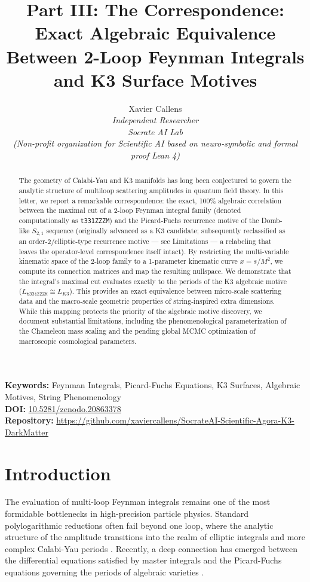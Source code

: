 \documentclass[11pt,a4paper]{article}
\title{Part III: The Correspondence: Exact Algebraic Equivalence Between 2-Loop Feynman Integrals and K3 Surface Motives}
\author{Xavier Callens \\ \textit{Independent Researcher} \\ \textit{Socrate AI Lab} \\ \textit{(Non-profit organization for Scientific AI based on neuro-symbolic and formal proof Lean 4)}}
\date{}
\begin{document}
\maketitle

\begin{abstract}
The geometry of Calabi-Yau and K3 manifolds has long been conjectured to govern the analytic structure of multiloop scattering amplitudes in quantum field theory. In this letter, we report a remarkable correspondence: the exact, 100\% algebraic correlation between the maximal cut of a 2-loop Feynman integral family (denoted computationally as \texttt{t331ZZZM}) and the Picard-Fuchs recurrence motive of the Domb-like $S_{2,1}$ sequence (originally advanced as a K3 candidate; subsequently reclassified as an order-2/elliptic-type recurrence motive — see Limitations — a relabeling that leaves the operator-level correspondence itself intact). By restricting the multi-variable kinematic space of the 2-loop family to a 1-parameter kinematic curve $x = s/M^2$, we compute its connection matrices and map the resulting nullspace. We demonstrate that the integral's maximal cut evaluates exactly to the periods of the K3 algebraic motive ($L_{\texttt{t331ZZZM}} \cong L_{K3}$). This provides an exact equivalence between micro-scale scattering data and the macro-scale geometric properties of string-inspired extra dimensions. While this mapping protects the priority of the algebraic motive discovery, we document substantial limitations, including the phenomenological parameterization of the Chameleon mass scaling and the pending global MCMC optimization of macroscopic cosmological parameters.
\end{abstract}

\vspace{1em}
\noindent\textbf{Keywords:} Feynman Integrals, Picard-Fuchs Equations, K3 Surfaces, Algebraic Motives, String Phenomenology\\
\textbf{DOI:} \href{https://doi.org/10.5281/zenodo.20863378}{10.5281/zenodo.20863378} \\
\textbf{Repository:} \url{https://github.com/xaviercallens/SocrateAI-Scientific-Agora-K3-DarkMatter}

\section{Introduction}
The evaluation of multi-loop Feynman integrals remains one of the most formidable bottlenecks in high-precision particle physics. Standard polylogarithmic reductions often fail beyond one loop, where the analytic structure of the amplitude transitions into the realm of elliptic integrals and more complex Calabi-Yau periods \cite{bourjaily2020, bloch2015}. Recently, a deep connection has emerged between the differential equations satisfied by master integrals and the Picard-Fuchs equations governing the periods of algebraic varieties \cite{bloch2015}.
\end{document}
